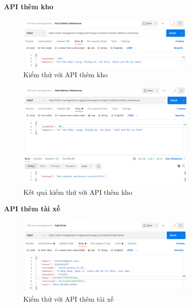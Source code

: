 		\newpage
		
		\textbf{API thêm kho}
		
		\begin{figure}[!ht]
			\includegraphics[width=0.8\textwidth]{Images/testing/API-add-address-warehouse.png}
			\centering
			\linebreak
			\caption{Kiểm thử với API thêm kho}
		\end{figure}
		
		\begin{figure}[!ht]
			\includegraphics[width=0.8\textwidth]{Images/testing/API-add-address-warehouse-result.png}
			\centering
			\linebreak
			\caption{Kết quả kiểm thử với API thêm kho}
		\end{figure}
		
		\newpage	
		
		\textbf{API thêm tài xế}
		
		\begin{figure}[!ht]
			\includegraphics[width=0.8\textwidth]{Images/testing/API-add-driver.png}
			\centering
			\linebreak
			\caption{Kiểm thử với API thêm tài xế}
		\end{figure}
		
